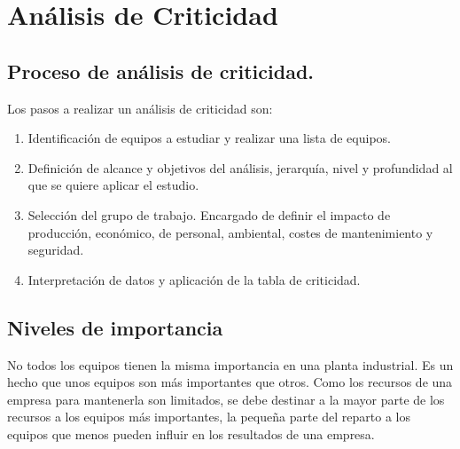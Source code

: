 \documentclass[../main]{subfiles}
\begin{document}
\section{Análisis de Criticidad}
\subsection{Proceso de análisis de criticidad.}
Los pasos a realizar un análisis de criticidad son:
\begin{enumerate}
    \item Identificación de equipos a estudiar y realizar una lista de equipos.
\item Definición de alcance y objetivos del análisis,
jerarquía, nivel y profundidad al que se quiere
aplicar el estudio.
\item Selección del grupo de trabajo. Encargado de
definir el impacto de producción, económico, de
personal, ambiental, costes de mantenimiento y
seguridad.
\item Interpretación de datos y aplicación de la tabla de criticidad. 
\end{enumerate}


\subsection{Niveles de importancia}
No todos los equipos tienen la misma importancia en una planta industrial. Es un hecho que unos equipos son más importantes que otros. Como los recursos de una empresa para mantenerla son limitados, se debe destinar a la mayor parte de los recursos a los equipos más importantes, la pequeña parte del reparto a los equipos que menos pueden influir en los resultados de una empresa.
\end{document}
